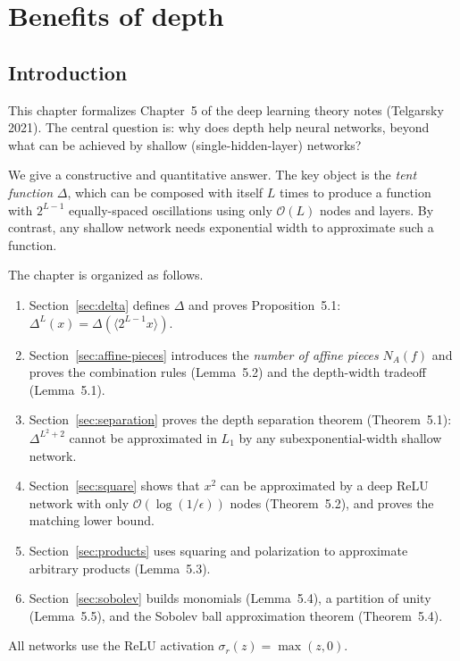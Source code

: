 \chapter{Benefits of depth}

\section{Introduction}

This chapter formalizes Chapter~5 of the deep learning theory notes (Telgarsky 2021).
The central question is: why does depth help neural networks, beyond what can be achieved
by shallow (single-hidden-layer) networks?

We give a constructive and quantitative answer.
The key object is the \emph{tent function} $\Delta$, which can be composed with itself $L$ times
to produce a function with $2^{L-1}$ equally-spaced oscillations using only $\mathcal{O}(L)$ nodes and layers.
By contrast, any shallow network needs exponential width to approximate such a function.

The chapter is organized as follows.
\begin{enumerate}
  \item Section~\ref{sec:delta} defines $\Delta$ and proves Proposition~5.1:
    $\Delta^L(x) = \Delta(\langle 2^{L-1}x \rangle)$.
  \item Section~\ref{sec:affine-pieces} introduces the \emph{number of affine pieces} $N_A(f)$
    and proves the combination rules (Lemma~5.2) and the depth-width tradeoff (Lemma~5.1).
  \item Section~\ref{sec:separation} proves the depth separation theorem (Theorem~5.1):
    $\Delta^{L^2+2}$ cannot be approximated in $L_1$ by any subexponential-width shallow network.
  \item Section~\ref{sec:square} shows that $x^2$ can be approximated by a deep ReLU network
    with only $\mathcal{O}(\log(1/\epsilon))$ nodes (Theorem~5.2), and proves the matching lower bound.
  \item Section~\ref{sec:products} uses squaring and polarization to approximate arbitrary products
    (Lemma~5.3).
  \item Section~\ref{sec:sobolev} builds monomials (Lemma~5.4), a partition of unity (Lemma~5.5),
    and the Sobolev ball approximation theorem (Theorem~5.4).
\end{enumerate}

All networks use the ReLU activation $\sigma_r(z) = \max(z, 0)$.

